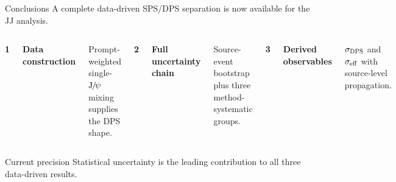 \documentclass[11pt,aspectratio=169]{beamer}
\begin{document}
\begin{frame}[label=p22]{Conclusions}
  \centering
  \small A complete data-driven SPS/DPS separation is now available for the JJ analysis.

  \vspace{1.0em}
  \begin{columns}[T,onlytextwidth]
      \centering
      {\color{positive}\LARGE\textbf{1}}\par\medskip
      \textbf{Data construction}\par\smallskip
      \small Prompt-weighted single-$\mathrm{J}\hspace{-.08em}/\hspace{-.14em}\psi$ mixing supplies the DPS shape.

      \centering
      {\color{emphasis}\LARGE\textbf{2}}\par\medskip
      \textbf{Full uncertainty chain}\par\smallskip
      \small Source-event bootstrap plus three method-systematic groups.

      \centering
      {\color{negative}\LARGE\textbf{3}}\par\medskip
      \textbf{Derived observables}\par\smallskip
      \small $\sigma_{\rm DPS}$ and $\sigma_{\rm eff}$ with source-level propagation.
  \end{columns}

  \vfill
  \begin{exampleblock}{Current precision}
    \centering
    Statistical uncertainty is the leading contribution to all three data-driven results.
  \end{exampleblock}
\end{frame}

\begin{frame}[label=p23]{\strut}
  \centering
  \vfill
  \vfill
\end{frame}
\end{document}
